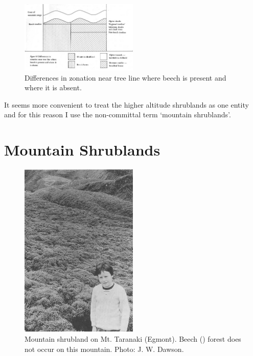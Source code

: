 \begin{figure}
	\includegraphics[width=0.5\textwidth]{graphics/figure90zonation.jpg}
	\centering
	\caption[Differences in zonation]{Differences in zonation near tree line where beech is present and where it is absent.}
	\label{fig:90zonation}
\end{figure}

It seems more convenient to treat the higher altitude shrublands as one entity and for this reason I use the non-committal term `mountain shrublands'.

\section{Mountain Shrublands}

\begin{figure}
	\includegraphics[width=0.5\textwidth]{graphics/figure91shrubland.jpg}
	\centering
	\caption[Mountain shrubland on Mt.
    Taranaki]{Mountain shrubland on Mt.
    Taranaki (Egmont).
    Beech () forest does not occur on this mountain.
	Photo: J. W. Dawson.}
	\label{fig:91shrubland}
\end{figure}

